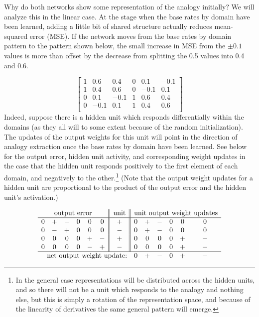 \documentclass[10pt,letterpaper]{article}
\begin{document}
Why do both networks show some representation of the analogy initially? We will analyze this in the linear case. At the stage when the base rates by domain have been learned, adding a little bit of shared structure actually reduces mean-squared error (MSE). If the network moves from the base rates by domain pattern to the pattern shown below, the small increase in MSE from the \(\pm 0.1\) values is more than offset by the decrease from splitting the 0.5 values into 0.4 and 0.6. \par
{ 
\[
\left[ \begin{matrix} 
1 & 0.6 & 0.4 & 0 & 0.1 & -0.1 \\
1 & 0.4 & 0.6 & 0 & -0.1 & 0.1 \\
0 & 0.1 & -0.1 & 1 & 0.6 & 0.4  \\
0 & -0.1 & 0.1 & 1 & 0.4 & 0.6  \\
\end{matrix}  \right] 
\] 
}
Indeed, suppose there is a hidden unit which responds differentially within the domains (as they all will to some extent because of the random initialization). The updates of the output weights for this unit will point in the direction of analogy extraction once the base rates by domain have been learned. See below for the output error, hidden unit activity, and corresponding weight updates in the case that the hidden unit responds positively to the first element of each domain, and negatively to the other.\footnote{In the general case representations will be distributed across the hidden units, and so there will not be a unit which responds to the analogy and nothing else, but this is simply a rotation of the representation space, and because of the linearity of derivatives the same general pattern will emerge.} (Note that the output weight updates for a hidden unit are proportional to the product of the output error and the hidden unit's activation.) \par
\vspace{-1em}
{ 
\[
\begin{array}{cccccc||c||cccccc} 
\multicolumn{6}{c||}{\text{output error}}  & \text{unit}  & \multicolumn{6}{c}{\text{unit output weight updates}} \\
\hline
 0 & + & - & 0 & 0 & 0  &   +    &  0 & + & - & 0 & 0 & 0   \\
0 & - & + & 0 & 0 & 0  &   -  & 0 & + & - & 0 & 0 & 0   \\
 0 & 0 & 0 & 0 & + & - &   +   &  0 & 0 & 0 & 0 & + & - \\
 0 & 0 & 0 & 0 & - & +  &  - &  0 & 0 & 0 & 0 & + & - \\
\hline
\multicolumn{7}{r}{\text{net output weight update:}} &   0 & + & - & 0 & + & - \\
\end{array} 
\]
}
\end{document}
